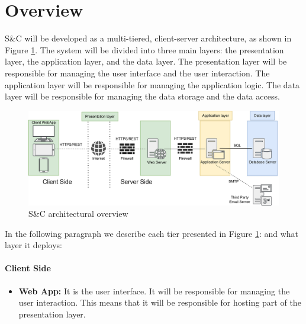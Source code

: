 \renewcommand{\thesection}{\Alph{section}}
\section{Overview}\label{sec:overview}
S\&C will be developed as a multi-tiered, client-server architecture, as shown in Figure \ref{fig:tiers_architecture}. The system will be divided into 
three main layers: the presentation layer, the application layer, and the data layer. The presentation layer will be responsible for managing the user 
interface and the user interaction. The application layer will be responsible for managing the application logic. The data layer will be responsible for 
managing the data storage and the data access.

\begin{figure}[H]
    \centering
    \includegraphics[width=1\textwidth]{Images/tiers_architecture.png}
    \caption{S\&C architectural overview}\label{fig:tiers_architecture}
\end{figure}

In the following paragraph we describe each tier presented in Figure \ref{fig:tiers_architecture}: and what layer it deploys:
\paragraph{Client Side}
\begin{itemize}
    \item \textbf{Web App:} It is the user interface. It will be responsible for managing the user interaction. This means that it will be responsible 
    for hosting part of the presentation layer. 
\end{itemize}

